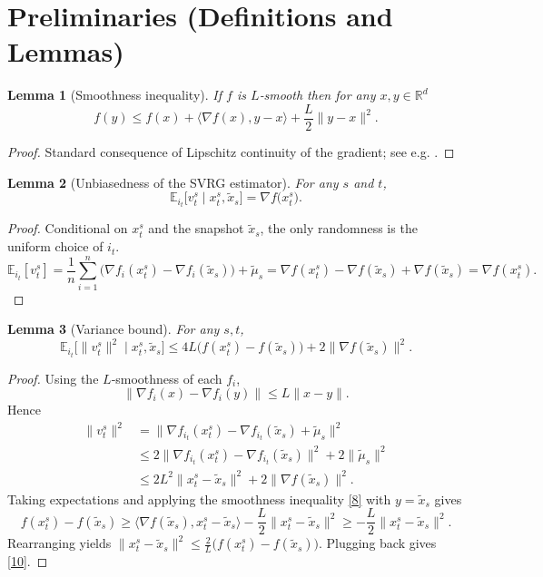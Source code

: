 \documentclass[11pt]{article}
\newtheorem{lemma}{Lemma}
\newcommand{\E}{\mathbb{E}}
\newcommand{\R}{\mathbb{R}}
\begin{document}
\newpage
\section*{Preliminaries (Definitions and Lemmas)}
\begin{lemma}[Smoothness inequality]\label{lem:smooth}
If $f$ is $L$‑smooth then for any $x,y\in\R^{d}$
\[
f(y)\le f(x)+\langle\nabla f(x),y-x\rangle+\frac{L}{2}\|y-x\|^{2}.
\tag{8}
\]
\end{lemma}
\begin{proof}
Standard consequence of Lipschitz continuity of the gradient; see e.g. \cite{nesterov2004introductory}. 
\end{proof}

\begin{lemma}[Unbiasedness of the SVRG estimator]\label{lem:unbiased}
For any $s$ and $t$,
\[
\E_{i_t}\!\bigl[v^{s}_t\mid x^{s}_t,\tilde{x}_s\bigr]=\nabla f\!\bigl(x^{s}_t\bigr).
\tag{9}
\]
\end{lemma}
\begin{proof}
Conditional on $x^{s}_t$ and the snapshot $\tilde{x}_s$, the only randomness is the uniform choice of $i_t$.
\[
\E_{i_t}[v^{s}_t]=\frac1n\sum_{i=1}^{n}\bigl(\nabla f_i(x^{s}_t)-\nabla f_i(\tilde{x}_s)\bigr)+\tilde{\mu}_s
= \nabla f(x^{s}_t)-\nabla f(\tilde{x}_s)+\nabla f(\tilde{x}_s)=\nabla f(x^{s}_t).
\]
\end{proof}

\begin{lemma}[Variance bound]\label{lem:variance}
For any $s,t$,
\[
\E_{i_t}\!\bigl[\|v^{s}_t\|^{2}\mid x^{s}_t,\tilde{x}_s\bigr]
\le 4L\bigl(f(x^{s}_t)-f(\tilde{x}_s)\bigr)+2\|\nabla f(\tilde{x}_s)\|^{2}.
\tag{10}
\]
\end{lemma}
\begin{proof}
Using the $L$‑smoothness of each $f_i$,
\[
\|\nabla f_i(x)-\nabla f_i(y)\|\le L\|x-y\|.
\]
Hence
\[
\begin{aligned}
\|v^{s}_t\|^{2}
&=\bigl\|\nabla f_{i_t}(x^{s}_t)-\nabla f_{i_t}(\tilde{x}_s)+\tilde{\mu}_s\bigr\|^{2}\\
&\le 2\|\nabla f_{i_t}(x^{s}_t)-\nabla f_{i_t}(\tilde{x}_s)\|^{2}+2\|\tilde{\mu}_s\|^{2}\\
&\le 2L^{2}\|x^{s}_t-\tilde{x}_s\|^{2}+2\|\nabla f(\tilde{x}_s)\|^{2}.
\end{aligned}
\]
Taking expectations and applying the smoothness inequality \eqref{8} with $y=\tilde{x}_s$ gives
\[
f(x^{s}_t)-f(\tilde{x}_s)\ge\langle\nabla f(\tilde{x}_s),x^{s}_t-\tilde{x}_s\rangle-\frac{L}{2}\|x^{s}_t-\tilde{x}_s\|^{2}
\ge -\frac{L}{2}\|x^{s}_t-\tilde{x}_s\|^{2}.
\]
Rearranging yields $\|x^{s}_t-\tilde{x}_s\|^{2}\le \frac{2}{L}\bigl(f(x^{s}_t)-f(\tilde{x}_s)\bigr)$. Plugging back gives \eqref{10}. 
\end{proof}
\end{document}
